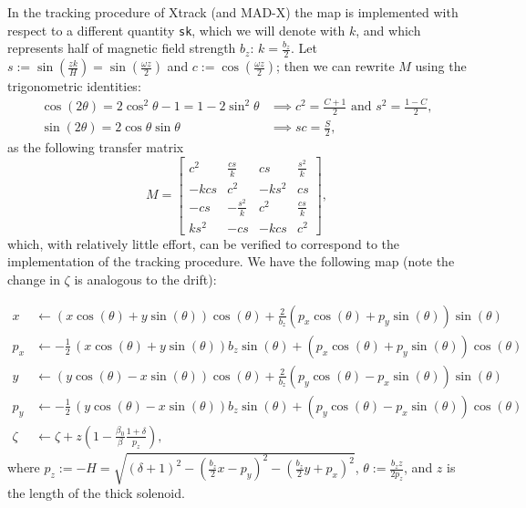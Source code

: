 In the tracking procedure of Xtrack (and MAD-X) the map is implemented with respect to a different quantity \verb|sk|, which we will denote with $k$, and which represents half of magnetic field strength $b_z$: $k = \frac{b_z}{2}$.
Let $s := \sin(\frac{z k}{H}) = \sin(\frac{\omega z}{2})$ and $c := \cos(\frac{\omega z}{2})$; then we can rewrite $M$ using the trigonometric identities:
\begin{align*}
  \cos(2 \theta) = 2 \cos^2\theta - 1 = 1 - 2 \sin^2\theta &\implies c^2 = \frac{C + 1}{2} \text{ and } s^2 = \frac{1 - C}{2}, \\
  \sin(2 \theta) = 2 \cos\theta \sin\theta &\implies sc = \frac{S}{2},
\end{align*}
as the following transfer matrix
\[
  M = \begin{bmatrix}
    c^2 & \frac{cs}{k} & cs & \frac{s^2}{k} \\
    -kcs & c^2 & -ks^2 & cs \\
    -cs & -\frac{s^2}{k} & c^2 & \frac{cs}{k} \\
    ks^2 & -cs & -kcs & c^2
  \end{bmatrix},
\]
which, with relatively little effort, can be verified to correspond to the implementation of the tracking procedure.
We have the following map (note the change in $\zeta$ is analogous to the drift):

\begin{align*}
  x &\leftarrow {\left(x \cos\left(\theta\right) + y \sin\left(\theta\right)\right)} \cos\left(\theta\right) + \frac{2}{b_{z}} {\left(p_{x} \cos\left(\theta\right) + p_{y} \sin\left(\theta\right)\right)} \sin\left(\theta\right) \\
  p_x &\leftarrow -\frac{1}{2} \, {\left(x \cos\left(\theta\right) + y \sin\left(\theta\right)\right)} b_{z} \sin\left(\theta\right) + {\left(p_{x} \cos\left(\theta\right) + p_{y} \sin\left(\theta\right)\right)} \cos\left(\theta\right) \\
  y &\leftarrow {\left(y \cos\left(\theta\right) - x \sin\left(\theta\right)\right)} \cos\left(\theta\right) + \frac{2}{b_{z}} {\left(p_{y} \cos\left(\theta\right) - p_{x} \sin\left(\theta\right)\right)} \sin\left(\theta\right) \\
  p_y &\leftarrow -\frac{1}{2} \, {\left(y \cos\left(\theta\right) - x \sin\left(\theta\right)\right)} b_{z} \sin\left(\theta\right) + {\left(p_{y} \cos\left(\theta\right) - p_{x} \sin\left(\theta\right)\right)} \cos\left(\theta\right) \\
  \zeta &\leftarrow \zeta + z (1 - \frac{\beta_0}{\beta} \frac{1 + \delta}{p_z}),
\end{align*}
where $p_z := -H = \sqrt{{\left(\delta + 1\right)}^2 - {\left(\frac{b_z}{2} x - p_{y}\right)}^{2} - {\left(\frac{b_{z}}{2} y + p_{x}\right)}^{2}}$, $\theta := \frac{b_{z} z}{2 p_z} $, and $z$ is the length of the thick solenoid.


